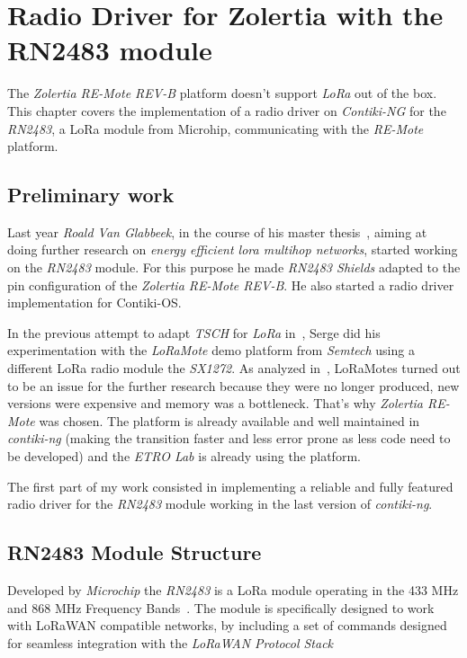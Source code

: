 \chapter{Radio Driver for Zolertia with the RN2483 module\label{section:radio}}


The \emph{Zolertia RE-Mote REV-B} platform doesn't support \emph{LoRa} out of
the box. This chapter covers the implementation of a radio driver on
\emph{Contiki-NG} for the \emph{RN2483}, a LoRa module from Microhip,
communicating with the \emph{RE-Mote} platform.

\section{Preliminary work}

Last year \emph{Roald Van Glabbeek}, in the course of his master thesis~\cite{8847137}, 
aiming at doing further research on \emph{energy efficient lora multihop networks}, 
started working on the \emph{RN2483} module.
For this purpose he made \emph{RN2483 Shields} adapted to the pin
configuration of the \emph{Zolertia RE-Mote REV-B}. He also started a radio driver
implementation for Contiki-OS\@.

In the previous attempt to adapt \emph{TSCH} for \emph{LoRa}
in~\cite{njomgang_2018}, Serge did his experimentation with the \emph{LoRaMote}
demo platform from \emph{Semtech} using a different LoRa radio module the
\emph{SX1272}. 
As analyzed in~\cite{8847137}, LoRaMotes turned out to be an issue for the
further research because they were no longer produced, 
new versions were expensive and memory was a bottleneck.
That's why \emph{Zolertia RE-Mote} was chosen. The platform is already available 
and well maintained in \emph{contiki-ng} (making the transition faster and less
error prone as less code need to be developed) and the \emph{ETRO Lab} is
already using the platform.

The first part of my work consisted in implementing a reliable
and fully featured radio driver for the \emph{RN2483} module working in the last
version of \emph{contiki-ng}.

\section{RN2483 Module Structure}

Developed by \emph{Microchip} the \emph{RN2483} is a LoRa module operating in
the 433 MHz and 868 MHz Frequency Bands~\cite{microchip:rn2483}. 
The module is specifically designed to work with LoRaWAN compatible networks, 
by including a set of commands designed for seamless integration with the
\emph{LoRaWAN Protocol Stack}

